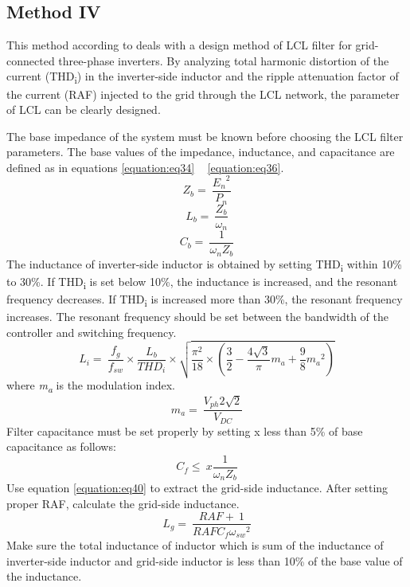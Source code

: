 \documentclass[12pt,a4paper]{book}
\begin{document}
\subsection{Method IV}
This method according to \cite{lcl2010} deals with a design method of LCL filter for grid-connected three-phase inverters. By analyzing total harmonic distortion of the current (THD\textsubscript{i}) in the inverter-side inductor and the ripple attenuation factor of the current (RAF) injected to the grid through the LCL network, the parameter of LCL can be clearly designed.

The base impedance of the system must be known before choosing the LCL filter parameters. The base values of the impedance, inductance, and capacitance are defined as in equations \ref{equation:eq34} ~ \ref{equation:eq36}.
\begin{equation}
  Z_{b} = \ \frac{{E_{n}}^{2}}{P_{n}}
  \label{equation:eq34}
\end{equation}
\begin{equation}
  L_{b} = \ \frac{Z_{b}}{\omega_{n}}
  \label{equation:eq35}
\end{equation}
\begin{equation}
  C_{b} = \ \frac{1}{\omega_{n}Z_{b}}
  \label{equation:eq36}
\end{equation}
The inductance of inverter-side inductor is obtained by setting THD\textsubscript{i} within 10\% to 30\%. If THD\textsubscript{i} is set below 10\%, the inductance is increased, and the resonant frequency decreases. If THD\textsubscript{i} is increased more than 30\%, the resonant frequency increases. The resonant frequency should be set between the bandwidth of the controller and switching frequency.
\begin{equation}
  L_{i} = \ \frac{f_{g}}{f_{sw}} \times \frac{L_{b}}{{THD}_{i}} \times \sqrt{\frac{\pi^{2}}{18} \times \left( \frac{3}{2} - \frac{4\sqrt{3}}{\pi}m_{a} + \frac{9}{8}{m_{a}}^{2} \right)}
  \label{equation:eq37}
\end{equation}
where \emph{m\textsubscript{a}} is the modulation index.
\begin{equation}
  m_{a} = \ \frac{V_{ph}2\sqrt{2}}{V_{DC}}
  \label{equation:eq38}
\end{equation}
Filter capacitance must be set properly by setting x less than 5\% of base capacitance as follows:
\begin{equation}
  C_{f} \leq \ x\frac{1}{\omega_{n}Z_{b}}
  \label{equation:eq39}
\end{equation}
Use equation \ref{equation:eq40} to extract the grid-side inductance. After setting proper RAF, calculate the grid-side inductance.
\begin{equation}
  L_{g} = \ \frac{RAF + \ 1}{{RAFC}_{f}{\omega_{sw}}^{2}}
  \label{equation:eq40}
\end{equation}
Make sure the total inductance of inductor which is sum of the inductance of inverter-side inductor and grid-side inductor is less than 10\% of the base value of the inductance.
\end{document}
